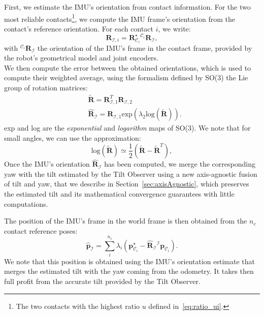 \documentclass{IJCAS}
\begin{document}
First, we estimate the IMU's orientation from contact information. For the two most reliable contacts\footnote{The two contacts with the highest ratio $u$ defined in~\eqref{eq:ratio_ui}.}, we compute the IMU frame's orientation from the contact's reference orientation. For each contact $i$, we write:
\begin{equation}
    \boldsymbol{R}_{\mathcal{I}, i} = \boldsymbol{R}^{\star}_{\mathcal{C}_{i}} {}^{\mathcal{C}_{i}} \boldsymbol{R}_{\mathcal{I}}, \label{eq:R_I_i}
\end{equation}
with ${}^{\mathcal{C}_{i}} \boldsymbol{R}_{\mathcal{I}}$ the orientation of the IMU's frame in the contact frame, provided by the robot's geometrical model and joint encoders.\\
We then compute the error between the obtained orientations, which is used to compute their weighted average, using the formalism defined by SO(3) the Lie group of rotation matrices:
\begin{align}
    &\tilde{\boldsymbol{R}} = \boldsymbol{R}^{T}_{\mathcal{I}, 1} \boldsymbol{R}_{\mathcal{I}, 2}  \\
 & \hat{\boldsymbol{R}}_{\mathcal{I}} = \boldsymbol{R}_{\mathcal{I}, 1} \text{exp} \left( \lambda_{2}\text{log} \left( \tilde{\boldsymbol{R}}\right)  \right). \label{eq:leg_odom_avg_ori}
\end{align}
exp and log are the \emph{exponential} and \emph{logarithm} maps of SO(3). We note that for small angles, we can use the approximation:
\begin{equation}
\text{log}\left(\tilde{\boldsymbol{R}}\right) \simeq \frac{1}{2} \left(\tilde{\boldsymbol{R}}-\tilde{\boldsymbol{R}}^{T}\right), \label{eq:log_small}
\end{equation}
Once the IMU's orientation $\hat{\boldsymbol{R}}_{\mathcal{I}}$ has been computed, we merge the corresponding yaw with the tilt estimated by the Tilt Observer using a new axis-agnostic fusion of tilt and yaw, that we describe in Section~\ref{sec:axisAgnostic}, which preserves the estimated tilt and its mathematical convergence guarantees with little computations.

The position of the IMU's frame in the world frame is then obtained from the $n_{c}$ contact reference poses: 
\begin{equation}
    \hat{\boldsymbol{p}}_{\mathcal{I}} = \sum^{n_{c}}_{i} \lambda_{i} \left( \boldsymbol{p}^{\star}_{{\mathcal{C}}_{i}} - \hat{\boldsymbol{R}}_{\mathcal{I}} {}^{\mathcal{I}}\boldsymbol{p}_{{\mathcal{C}}_{i}} \right). \label{eq:est_p_imu}
\end{equation}
We note that this position is obtained using the IMU's orientation estimate that merges the estimated tilt with the yaw coming from the odometry. It takes then full profit from the accurate tilt provided by the Tilt Observer.
\end{document}
